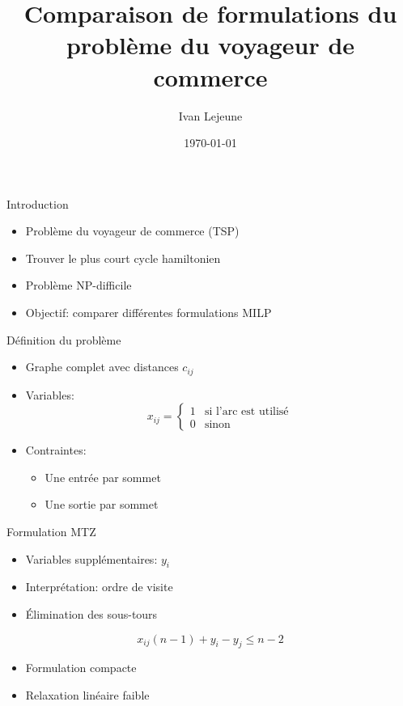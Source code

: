 \documentclass{beamer}
\title{Comparaison de formulations du problème du voyageur de commerce}
\author{Ivan Lejeune}
\date{\today}
\begin{document}
\frame{\titlepage}

\begin{frame}{Introduction}
\begin{itemize}
    \item Problème du voyageur de commerce (TSP)
    \item Trouver le plus court cycle hamiltonien
    \item Problème NP-difficile
    \item Objectif: comparer différentes formulations MILP
\end{itemize}
\end{frame}

\begin{frame}{Définition du problème}
\begin{itemize}
    \item Graphe complet avec distances $c_{ij}$
    \item Variables:
    \[
    x_{ij} =
    \begin{cases}
    1 & \text{si l'arc est utilisé} \\
    0 & \text{sinon}
    \end{cases}
    \]
    \item Contraintes:
    \begin{itemize}
        \item Une entrée par sommet
        \item Une sortie par sommet
    \end{itemize}
\end{itemize}
\end{frame}

\begin{frame}{Formulation MTZ}
\begin{itemize}
    \item Variables supplémentaires: $y_i$
    \item Interprétation: ordre de visite
    \item Élimination des sous-tours
\end{itemize}

\[
x_{ij}(n-1) + y_i - y_j \leq n-2
\]

\begin{itemize}
    \item Formulation compacte
    \item Relaxation linéaire faible
\end{itemize}
\end{frame}
\end{document}
